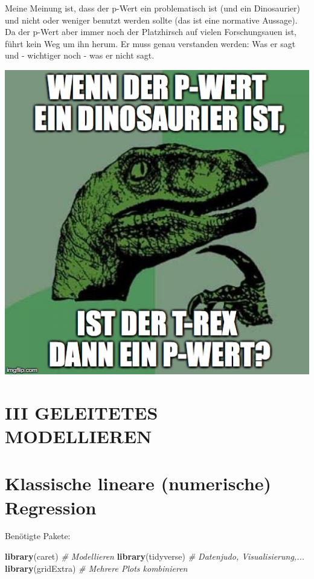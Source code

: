 \documentclass[12pt,]{book}
\newenvironment{Shaded}{\begin{snugshade}}{\end{snugshade}}
\newcommand{\KeywordTok}[1]{\textcolor[rgb]{0.13,0.29,0.53}{\textbf{{#1}}}}
\newcommand{\CommentTok}[1]{\textcolor[rgb]{0.56,0.35,0.01}{\textit{{#1}}}}
\newcommand{\NormalTok}[1]{{#1}}
\begin{document}
Meine Meinung ist, dass der p-Wert ein problematisch ist (und ein
Dinosaurier) und nicht oder weniger benutzt werden sollte (das ist eine
normative Aussage). Da der p-Wert aber immer noch der Platzhirsch auf
vielen Forschungsauen ist, führt kein Weg um ihn herum. Er muss genau
verstanden werden: Was er sagt und - wichtiger noch - was er nicht sagt.

\includegraphics[width=6.94in]{images/meme_pwert_1iw22a_pvalue_dino}

\chapter*{III GELEITETES MODELLIEREN}\label{iii-geleitetes-modellieren}

\chapter{Klassische lineare (numerische)
Regression}\label{klassische-lineare-numerische-regression}

Benötigte Pakete:

\begin{Shaded}
\begin{Highlighting}[]
\KeywordTok{library}\NormalTok{(caret)  }\CommentTok{# Modellieren}
\KeywordTok{library}\NormalTok{(tidyverse)  }\CommentTok{# Datenjudo, Visualisierung,...}
\KeywordTok{library}\NormalTok{(gridExtra)  }\CommentTok{# Mehrere Plots kombinieren}
\end{Highlighting}
\end{Shaded}
\end{document}
